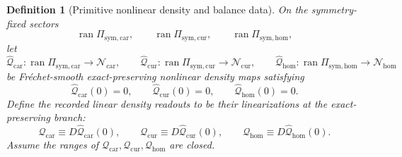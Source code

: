 \documentclass[11pt]{article}
\newcommand{\TensorSymProj}{\Pi_{\mathrm{sym,car}}}
\newcommand{\CurSymProj}{\Pi_{\mathrm{sym,cur}}}
\newcommand{\HomSymProj}{\Pi_{\mathrm{sym,hom}}}
\newcommand{\TensorDensityClass}{\mathscr N_{\mathrm{car}}}
\newcommand{\CurDensityClass}{\mathscr N_{\mathrm{cur}}}
\newcommand{\HomDensityClass}{\mathscr N_{\mathrm{hom}}}
\newcommand{\TensorDensity}{\mathcal Q_{\mathrm{car}}}
\newcommand{\CurDensity}{\mathcal Q_{\mathrm{cur}}}
\newcommand{\HomDensity}{\mathcal Q_{\mathrm{hom}}}
\newcommand{\TensorPrimitiveDensity}{\widehat{\mathcal Q}_{\mathrm{car}}}
\newcommand{\CurPrimitiveDensity}{\widehat{\mathcal Q}_{\mathrm{cur}}}
\newcommand{\HomPrimitiveDensity}{\widehat{\mathcal Q}_{\mathrm{hom}}}
\newtheorem{definition}{Definition}
\begin{document}
\begin{definition}[Primitive nonlinear density and balance data]
\label{def:primitive_balance}
On the symmetry-fixed sectors
\[
\operatorname{ran}\TensorSymProj,\qquad
\operatorname{ran}\CurSymProj,\qquad
\operatorname{ran}\HomSymProj,
\]
let
\[
\TensorPrimitiveDensity:\operatorname{ran}\TensorSymProj\to\TensorDensityClass,\qquad
\CurPrimitiveDensity:\operatorname{ran}\CurSymProj\to\CurDensityClass,\qquad
\HomPrimitiveDensity:\operatorname{ran}\HomSymProj\to\HomDensityClass
\]
be Fr\'echet-smooth exact-preserving nonlinear density maps satisfying
\begin{equation}
\TensorPrimitiveDensity(0)=0,\qquad
\CurPrimitiveDensity(0)=0,\qquad
\HomPrimitiveDensity(0)=0.
\label{eq:primitive_density_zero}
\end{equation}
Define the recorded linear density readouts to be their linearizations at the exact-preserving branch:
\begin{equation}
\TensorDensity\equiv D\TensorPrimitiveDensity(0),\qquad
\CurDensity\equiv D\CurPrimitiveDensity(0),\qquad
\HomDensity\equiv D\HomPrimitiveDensity(0).
\label{eq:density_linearization}
\end{equation}
Assume the ranges of \(\TensorDensity,\CurDensity,\HomDensity\) are closed.


\end{definition}
\end{document}
